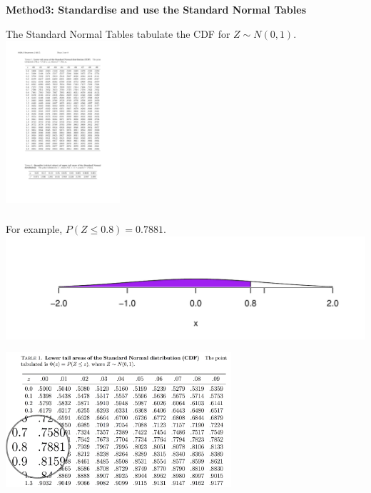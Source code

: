 \documentclass[t,xcolor=pdftex,dvipsnames,table]{beamer}
\makeatletter
\def\maxwidth{ %
  \ifdim\Gin@nat@width>\linewidth
    \linewidth
  \else
    \Gin@nat@width
  \fi
}
\newenvironment{knitrout}{}{} %
\makeatother
\begin{document}
\begin{frame}[fragile]\frametitle{}

{\bf Method3: Standardise and use the Standard Normal Tables} 

\vspace{.5cm}
The Standard Normal Tables tabulate the CDF for $Z \sim N(0,1)$. \\

\vspace{.5cm}
\includegraphics[height=6cm]{../images/NormalTableSample.pdf}

\end{frame}


\begin{frame}[fragile]\frametitle{}

For example, $P(Z \leq 0.8) = 0.7881$. \\

\begin{knitrout}
\color{fgcolor}
\includegraphics[width=\maxwidth]{figure/unnamed-chunk-16-1} 

\end{knitrout}

\includegraphics[height=5cm]{../images/NormalTableEg1.jpg}
\end{frame}
\end{document}
